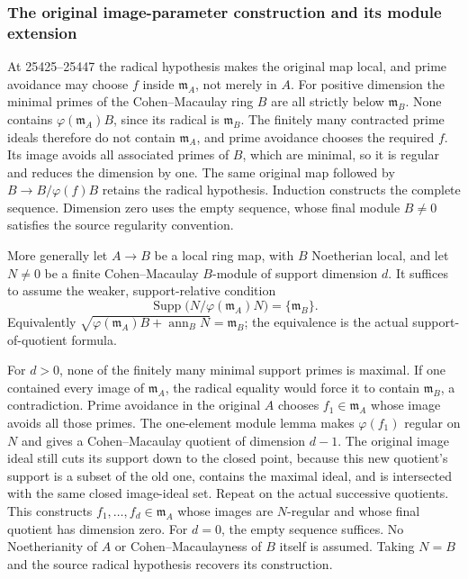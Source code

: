 \subsubsection{The original image-parameter construction and its module extension}\label{algebra-proof-019-the-original-image-parameter-construction-and-its-module-extension}

At 25425--25447 the radical hypothesis makes the original map local, and prime avoidance may choose \(f\) inside \(\mathfrak m_A\), not merely in \(A\). For positive dimension the minimal primes of the Cohen--Macaulay ring \(B\) are all strictly below \(\mathfrak m_B\). None contains \(\varphi(\mathfrak m_A)B\), since its radical is \(\mathfrak m_B\). The finitely many contracted prime ideals therefore do not contain \(\mathfrak m_A\), and prime avoidance chooses the required \(f\). Its image avoids all associated primes of \(B\), which are minimal, so it is regular and reduces the dimension by one. The same original map followed by \(B\to B/\varphi(f)B\) retains the radical hypothesis. Induction constructs the complete sequence. Dimension zero uses the empty sequence, whose final module \(B\ne0\) satisfies the source regularity convention.

More generally let \(A\to B\) be a local ring map, with \(B\) Noetherian local, and let \(N\ne0\) be a finite Cohen--Macaulay \(B\)-module of support dimension \(d\). It suffices to assume the weaker, support-relative condition \[
 \operatorname{Supp}\bigl(N/\varphi(\mathfrak m_A)N\bigr)
       =\{\mathfrak m_B\}.
\] Equivalently \(\sqrt{\varphi(\mathfrak m_A)B+\operatorname{ann}_B N}=\mathfrak m_B\); the equivalence is the actual support-of-quotient formula.

For \(d>0\), none of the finitely many minimal support primes is maximal. If one contained every image of \(\mathfrak m_A\), the radical equality would force it to contain \(\mathfrak m_B\), a contradiction. Prime avoidance in the original \(A\) chooses \(f_1\in\mathfrak m_A\) whose image avoids all those primes. The one-element module lemma makes \(\varphi(f_1)\) regular on \(N\) and gives a Cohen--Macaulay quotient of dimension \(d-1\). The original image ideal still cuts its support down to the closed point, because this new quotient's support is a subset of the old one, contains the maximal ideal, and is intersected with the same closed image-ideal set. Repeat on the actual successive quotients. This constructs \(f_1,\ldots,f_d\in\mathfrak m_A\) whose images are \(N\)-regular and whose final quotient has dimension zero. For \(d=0\), the empty sequence suffices. No Noetherianity of \(A\) or Cohen--Macaulayness of \(B\) itself is assumed. Taking \(N=B\) and the source radical hypothesis recovers its construction.

